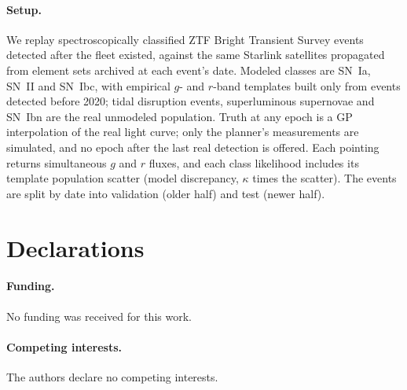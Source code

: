 \documentclass[12pt]{article}
\begin{document}
\paragraph{Setup.} We replay spectroscopically classified ZTF Bright Transient Survey events \citep{Fremling2020,Perley2020} detected after the fleet existed, against the same Starlink satellites propagated from element sets archived at each event's date. Modeled classes are SN~Ia, SN~II and SN~Ibc, with empirical $g$- and $r$-band templates built only from events detected before 2020; tidal disruption events, superluminous supernovae and SN~Ibn are the real unmodeled population. Truth at any epoch is a GP interpolation of the real light curve; only the planner's measurements are simulated, and no epoch after the last real detection is offered. Each pointing returns simultaneous $g$ and $r$ fluxes, and each class likelihood includes its template population scatter (model discrepancy, $\kappa$ times the scatter). The events are split by date into validation (older half) and test (newer half).








\section*{Declarations}
\paragraph{Funding.} No funding was received for this work.
\paragraph{Competing interests.} The authors declare no competing interests.
\end{document}
